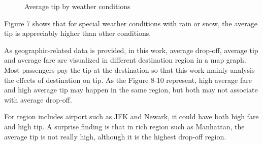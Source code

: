 \documentclass[11pt]{article}
\begin{document}
\begin{figure}[h]
\begin{minipage}[t]{0.35\textwidth}
    \caption{Average tip by weather conditions}
\end{minipage}
\end{figure}

Figure 7 shows that for special weather conditions with rain or snow, the average tip is appreciably higher than other conditions.

As geographic-related data is provided, in this work, average drop-off, average tip and average fare are visualized in different destination region in a map graph. Most passengers pay the tip at the destination so that this work mainly analysis the effects of destination on tip. As the Figure 8-10 represent, high average fare and high average tip may happen in the same region, but both may not associate with average drop-off.


For region includes airport such as JFK and Newark, it could have both high fare and high tip. A surprise finding is that in rich region such as Manhattan, the average tip is not really high, although it is the highest drop-off region.
\end{document}
